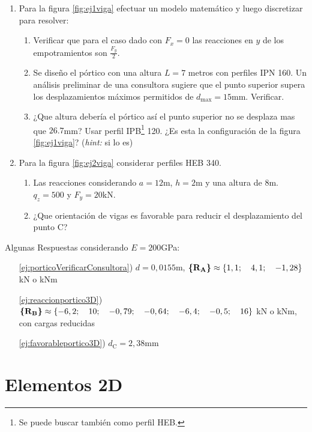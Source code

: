 \begin{enumerate}
	\item Para la figura \ref{fig:ej1viga} efectuar un modelo matemático y luego discretizar para resolver:
	\begin{enumerate}
		\item Verificar que para el caso dado con $F_x=0$ las reacciones en $y$ de los empotramientos son $\frac{F_y}{2}$.
		\item Se diseño el pórtico con una altura $L=7$ metros con perfiles IPN 160. Un análisis preliminar de una consultora sugiere que el punto superior supera los desplazamientos máximos permitidos de $d_{\max}=15$mm. Verificar.\label{ej:porticoVerificarConsultora}
		\item ¿Que altura debería el pórtico así el punto superior no se desplaza mas que $26.7$mm? Usar perfil IPB\footnote{Se puede buscar también como perfil HEB.} 120. ¿Es esta la configuración de la figura \ref{fig:ej1viga}? (\textit{hint:} si lo es)\label{ej:probvigaaltura}
	\end{enumerate}
	\item Para la figura \ref{fig:ej2viga} considerar perfiles HEB 340. 
	\begin{enumerate}
		\item Las reacciones considerando $a=12$m, $h=2$m  y una altura de $8$m. $q_z=500$ y $F_y=20$kN. \label{ej:reaccionportico3D}
		\item ¿Que orientación de vigas es favorable para reducir el desplazamiento del punto C?\label{ej:favorableportico3D} 
	\end{enumerate}
\end{enumerate}
Algunas Respuestas considerando $E=200$GPa:
\begin{itemize}
	\item[\ref{ej:porticoVerificarConsultora})]$d=0,0155$m, $\boldsymbol{\{ }\mathbf{R_A} \boldsymbol{\}}\approx\{1,1;\ \ \ 4,1;\ \ \ -1,28\}$ kN o kNm
	
	\item[\ref{ej:reaccionportico3D})] $\boldsymbol{\{ }\mathbf{R_B} \boldsymbol{\}}\approx
	\{-6,2;\ \ \     10;\ \ \    -0,79;\ \ \    -0,64;\ \ \    -6,4;\ \ \    -0,5;\ \ \    16\}$ kN o kNm, con cargas reducidas
	
	\item[\ref{ej:favorableportico3D})] $d_{\mathrm{C}}=2,38$mm
	
\end{itemize}
\clearpage
\part{Elementos 2D}

